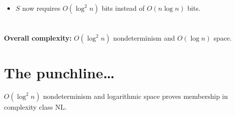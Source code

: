 \documentclass{lposter-with-tkz-graph} %
\newenvironment{poster}{%
\thispagestyle{fancy}
\begin{multicols*}{3}
}%
{\end{multicols*}
}
\begin{document}
\begin{poster}
\begin{itemize}
\itemsep1em
\item[] $S$ now requires $O(\log^2 n)$ bits instead of $O(n \log n)$ bits.
\end{itemize}

\section{}

\begin{center}
  \textbf{Overall complexity:} $O(\log^2 n)$ nondeterminism and $O(\log n)$ space.
\end{center}

\section{The punchline\ldots}

$O(\log^2 n)$ nondeterminism and logarithmic space proves membership in complexity class \textsf{NL}.

\end{poster}
\end{document}
